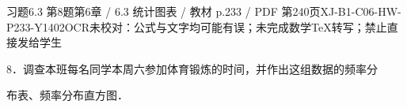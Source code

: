 \begin{bankitem}{习题6.3 第8题}{第6章 / 6.3 统计图表 / 教材 p.233 / PDF 第240页}{XJ-B1-C06-HW-P233-Y1402}{OCR未校对：公式与文字均可能有误；未完成数学TeX转写；禁止直接发给学生}
\begin{ocrdraft}
\par
8．调查本班每名同学本周六参加体育锻炼的时间，并作出这组数据的频率分
\par
布表、频率分布直方图．
\end{ocrdraft}
\end{bankitem}

